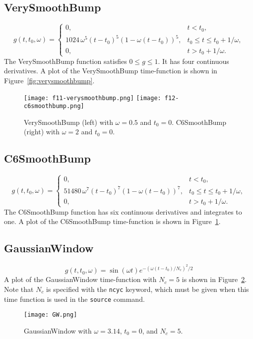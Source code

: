\documentclass[11pt]{report}
\begin{document}
\subsection{VerySmoothBump} 
\[
g(t,t_0,\omega) = \left\{ 
\begin{array}{ll} 
0, & t < t_0,\\ 
1024\,\omega^5(t-t_0)^5 (1 - \omega(t-t_0))^5,& t_0 \leq t \leq t_0+1/\omega,\\ 
0, & t > t_0 + 1/\omega.
\end{array}
\right.
\]
The VerySmoothBump function satisfies $0\leq g\leq 1$. It has four continuous derivatives.
A plot of the VerySmoothBump time-function is shown in Figure~\ref{fig:verysmoothbump}.
\begin{figure}
\begin{centering}
  \texttt{[image: f11-verysmoothbump.png]}
  \texttt{[image: f12-c6smoothbump.png]}
  \caption{VerySmoothBump (left) with $\omega=0.5$ and
    $t_0=0$. C6SmoothBump (right) with $\omega=2$ and $t_0=0$.}
  \label{fig:verysmoothbump}  \label{fig:c6smoothbump}
\end{centering}
\end{figure}  
%
\subsection{C6SmoothBump} 
\[
g(t,t_0,\omega) = \left\{ 
\begin{array}{ll} 
0, & t < t_0,\\ 
51480\, \omega^7 (t-t_0)^7 (1- \omega(t-t_0))^7, & t_0 \leq t \leq t_0 + 1/\omega,\\ 
0, & t > t_0 + 1/\omega.
\end{array}
\right.
\]
The C6SmoothBump function has six continuous derivatives and integrates to one.
A plot of the C6SmoothBump time-function is shown in Figure~\ref{fig:c6smoothbump}.
%
\subsection{GaussianWindow}
\[
g(t,t_0,\omega) = \sin(\omega t) e^{-(\omega(t-t_0)/N_c)^2/2}
\]
A plot of the GaussianWindow time-function with $N_c=5$ is shown in
Figure~\ref{fig:gaussianwindow}. Note that $N_c$ is specified with the \verb+ncyc+ keyword, which
must be given when this time function is used in the \verb+source+ command.
\begin{figure}
\begin{centering}
  \texttt{[image: GW.png]}
  \caption{GaussianWindow with $\omega=3.14$, $t_0=0$, and $N_c=5$.}
  \label{fig:gaussianwindow}
\end{centering}
\end{figure}  
\end{document}

